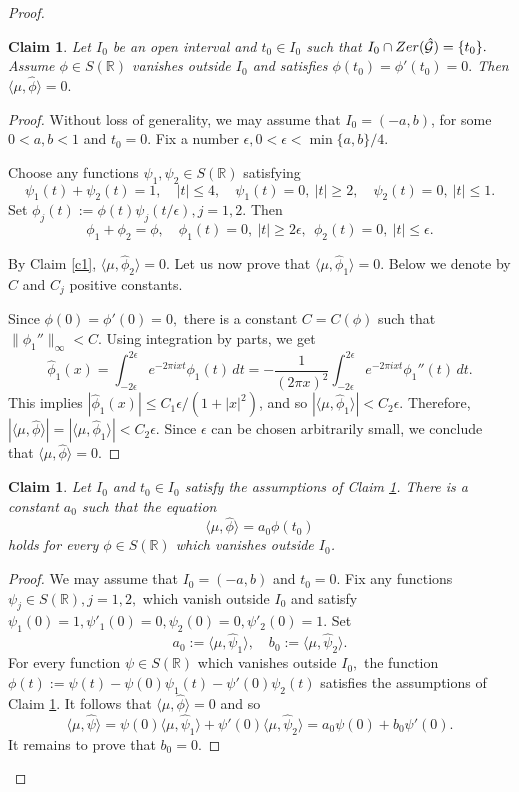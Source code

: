 \documentclass[12pt]{amsart}
\numberwithin{equation}{section}
\newtheorem{claim}[theorem]{Claim}
\newcommand{\R}{{\mathbb R}} \newcommand{\Q}{{\mathbb Q}} \newcommand{\Z}{{\mathbb Z}} \newcommand{\N}{{\mathbb N}}
\newcommand{\Zer}{{\rm Zer}}
\begin{document}
\begin{proof}
\begin{claim}\label{c2}
    Let $I_0$ be an open interval and $t_0\in I_0$ such that $I_0\cap \Zer(\hat\Ff)=\{t_0\}.$
    Assume $\phi\in S(\R)$ vanishes outside $I_0$ and satisfies $\phi(t_0)=\phi'(t_0)=0.$
    Then $\langle\mu,\hat\phi\rangle=0.$
\end{claim}

\begin{proof}  
Without loss of generality, we may assume that $I_0=(-a,b)$, for some $0<a,b<1$
 and $t_0=0$. Fix a number $\epsilon, 0<\epsilon<\min\{a,b\}/4$. 
 
 Choose any functions $\psi_1,\psi_2\in S(\R)$ satisfying $$\psi_1(t)+\psi_2(t)=1, \quad |t|\leq 4, \quad \psi_1(t)=0,\ |t|\geq 2,\quad  \psi_2(t)=0,\ |t|\leq 1.$$
Set
$\phi_j(t):=\phi(t)\psi_j(t/\epsilon), j=1,2$. Then $$\phi_1+\phi_2=\phi,\quad \phi_1(t)=0, \ |t|\geq 2\epsilon,\ \  \phi_2(t)=0,\ |t|\leq \epsilon.$$

By Claim \ref{c1}, $\langle\mu,\hat\phi_2\rangle=0.$ Let us now prove that $\langle\mu,\hat\phi_1\rangle=0.$
Below we denote by $C$ and $C_j$ positive constants.

Since $\phi(0)=\phi'(0)=0,$ there is a constant $C=C(\phi)$ such that  $\|\phi_1''\|_\infty< C.$
   Using integration by parts, we get $$\hat\phi_1(x)=\int_{-2\epsilon}^{2\epsilon}e^{-2\pi i xt}\phi_1(t)\,dt=-\frac{1}{(2\pi x)^2}\int_{-2\epsilon}^{2\epsilon}e^{-2\pi i xt}\phi_1''(t)\,dt.$$  This  implies $|\hat\phi_1(x)|\leq C_1\epsilon/(1+|x|^2)$, and so $|\langle\mu,\hat\phi_1\rangle|<C_2\epsilon.$ Therefore,
$|\langle \mu,\hat\phi\rangle|=|\langle\mu,\hat\phi_1\rangle|<C_2\epsilon.$ Since $\epsilon$ can be chosen arbitrarily small, we conclude that $\langle\mu,\hat\phi\rangle=0$.
\end{proof}

\begin{claim}\label{c3}
    Let $I_0$ and  $t_0\in I_0$ satisfy the assumptions of Claim \ref{c2}. There is a constant $a_0$ such that the equation    \begin{equation}\label{eqe}\langle\mu,\hat\phi\rangle=a_0\phi(t_0)\end{equation} holds for every  $\phi\in S(\R)$ which vanishes outside $I_0$.
\end{claim}

\begin{proof}
We may assume that  $I_0=(-a,b)$ and $t_0=0$.
    Fix any functions  $\psi_j\in S(\R), j=1,2,$  which vanish outside $I_0$ and satisfy $\psi_1(0)=1,\psi'_1(0)=0, \psi_2(0)=0, \psi'_2(0)=1.$ Set
$$a_0:=\langle\mu,\hat\psi_1\rangle,\quad b_0:=\langle\mu,\hat\psi_2\rangle.$$For every function $\psi\in S(\R)$ which vanishes outside $I_0,$
the function $\phi(t):=\psi(t)-\psi(0)\psi_1(t)-\psi'(0)\psi_2(t)$ satisfies the assumptions of Claim \ref{c2}.
It follows that $\langle\mu,\hat\phi\rangle=0$ and so \begin{equation}\label{ab0}\langle \mu,\hat\psi \rangle =\psi(0)\langle\mu,\hat\psi_1\rangle+\psi'(0)\langle\mu,\hat\psi_2\rangle=a_0\psi(0)+b_0\psi'(0).\end{equation}It remains to prove that $b_0=0.$


\end{proof}
\end{proof}
\end{document}
